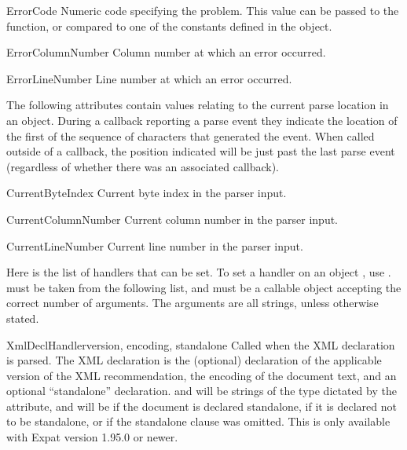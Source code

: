 \begin{memberdesc}[xmlparser]{ErrorCode} 
Numeric code specifying the problem.  This value can be passed to the
 function, or compared to one of the constants
defined in the  object.
\end{memberdesc}

\begin{memberdesc}[xmlparser]{ErrorColumnNumber} 
Column number at which an error occurred.
\end{memberdesc}

\begin{memberdesc}[xmlparser]{ErrorLineNumber}
Line number at which an error occurred.
\end{memberdesc}

The following attributes contain values relating to the current parse
location in an  object.  During a callback reporting
a parse event they indicate the location of the first of the sequence
of characters that generated the event.  When called outside of a
callback, the position indicated will be just past the last parse
event (regardless of whether there was an associated callback).

\begin{memberdesc}[xmlparser]{CurrentByteIndex} 
Current byte index in the parser input.
\end{memberdesc} 

\begin{memberdesc}[xmlparser]{CurrentColumnNumber} 
Current column number in the parser input.
\end{memberdesc}

\begin{memberdesc}[xmlparser]{CurrentLineNumber}
Current line number in the parser input.
\end{memberdesc}

Here is the list of handlers that can be set.  To set a handler on an
 object , use
.   must
be taken from the following list, and  must be a callable
object accepting the correct number of arguments.  The arguments are
all strings, unless otherwise stated.

\begin{methoddesc}[xmlparser]{XmlDeclHandler}{version, encoding, standalone}
Called when the XML declaration is parsed.  The XML declaration is the
(optional) declaration of the applicable version of the XML
recommendation, the encoding of the document text, and an optional
``standalone'' declaration.   and  will be
strings of the type dictated by the 
attribute, and  will be  if the document is
declared standalone,  if it is declared not to be standalone,
or  if the standalone clause was omitted.
This is only available with Expat version 1.95.0 or newer.
\end{methoddesc}

